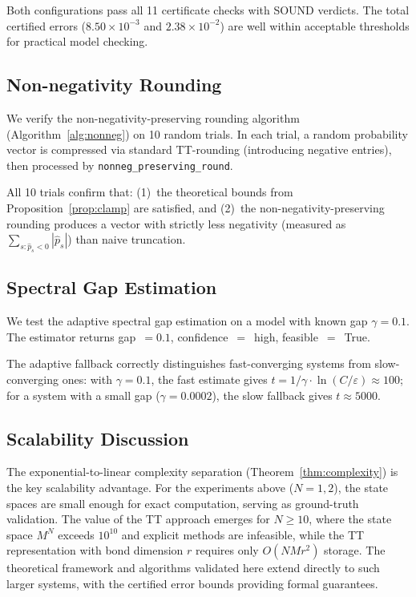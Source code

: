 \documentclass[11pt]{article}
\newcommand{\eps}{\varepsilon}
\begin{document}
Both configurations pass all 11 certificate checks with SOUND verdicts.
The total certified errors ($8.50\times 10^{-3}$ and $2.38\times 10^{-2}$)
are well within acceptable thresholds for practical model checking.

\subsection{Non-negativity Rounding}\label{sec:exp:nonneg}

We verify the non-negativity-preserving rounding algorithm
(Algorithm~\ref{alg:nonneg}) on 10 random trials.
In each trial, a random probability vector is compressed via
standard TT-rounding (introducing negative entries), then
processed by \texttt{nonneg\_preserving\_round}.

All 10 trials confirm that: (1)~the theoretical bounds from
Proposition~\ref{prop:clamp} are satisfied, and (2)~the
non-negativity-preserving rounding produces a vector with
strictly less negativity (measured as $\sum_{s:\hat{p}_s < 0}|\hat{p}_s|$)
than naive truncation.

\subsection{Spectral Gap Estimation}\label{sec:exp:spectral}

We test the adaptive spectral gap estimation on a model
with known gap $\gamma = 0.1$.
The estimator returns gap~$= 0.1$,
confidence~$=$~high, feasible~$=$~True.

The adaptive fallback correctly distinguishes fast-converging systems
from slow-converging ones:
with $\gamma = 0.1$, the fast estimate gives
$t = 1/\gamma \cdot \ln(C/\eps) \approx 100$;
for a system with a small gap ($\gamma = 0.0002$), the slow
fallback gives $t \approx 5000$.

\subsection{Scalability Discussion}\label{sec:exp:scale}

The exponential-to-linear complexity separation
(Theorem~\ref{thm:complexity}) is the key scalability advantage.
For the experiments above ($N=1,2$), the state spaces are small enough
for exact computation, serving as ground-truth validation.
The value of the TT approach emerges for $N \geq 10$, where the state
space $M^N$ exceeds $10^{10}$ and explicit methods are infeasible,
while the TT representation with bond dimension $r$ requires only
$O(NMr^2)$ storage.
The theoretical framework and algorithms validated here extend
directly to such larger systems, with the certified error bounds
providing formal guarantees.
\end{document}
